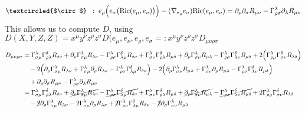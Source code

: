 \documentclass[a4paper,11pt]{article}
\newcommand{\R}{{\mathrm{Ric}}}
\begin{document}
\begin{align*}
    \textcircled{$\circ$}\;\;: \; e_\rho\Big(e_\sigma\big(\R(e_\mu, e_\nu)\big)\Big) - (\nabla_{e_\rho}e_\sigma)\R(e_\mu,e_\nu)
    = \partial_\rho\partial_\sigma R_{\mu\nu} - \Gamma_{\rho\sigma}^\lambda \partial_\lambda R_{\mu\nu}
\end{align*}
This allows us to compute $D$, using $D(X,Y,Z,Z)=x^\mu y^\nu z^\rho z^\sigma D(e_\mu, e_\nu, e_\rho, e_\sigma =: x^\mu y^\nu z^\rho z^\sigma D_{\mu\nu\rho\sigma}$
\begin{align*}
D_{\mu\nu\rho\sigma} &= \Gamma_{\sigma\mu}^\lambda\Gamma_{\rho\lambda}^\delta R_{\delta\nu}
    + \partial_\rho\Gamma_{\sigma\mu}^\lambda R_{\lambda\nu}
    - \Gamma_{\rho\sigma}^\lambda \Gamma_{\lambda\mu}^\delta R_{\delta\nu}
    + \Gamma_{\sigma\nu}^\lambda \Gamma_{\rho\lambda}^\delta R_{\mu\delta}
    + \partial_\rho  \Gamma_{\sigma\nu}^\lambda R_{\mu\lambda}
    - \Gamma_{\rho\sigma}^\lambda \Gamma_{\lambda\nu}^\delta R_{\mu\delta}
    + 2 \Big(\Gamma_{\rho\mu}^\lambda\Gamma_{\sigma\nu}^\delta R_{\lambda\delta}\Big)\\
    &\quad -2\Big( \partial_\rho \Gamma_{\sigma\mu}^\lambda R_{\lambda\nu} + \Gamma_{\sigma\mu}^\lambda \partial_\rho R_{\lambda\nu} - \Gamma_{\rho\sigma}^\lambda \Gamma_{\lambda\mu}^\delta R_{\delta\nu}\Big)
    -2 \Big(\partial_\rho \Gamma_{\sigma\nu}^\lambda R_{\mu\lambda}
    + \Gamma_{\sigma\nu}^\lambda \partial_\rho R_{\mu\lambda}
    - \Gamma_{\rho\sigma}^\lambda \Gamma_{\lambda\nu}^\delta R_{\mu\delta}\Big)\\
    &\quad  + \partial_\rho\partial_\sigma R_{\mu\nu}
    - \Gamma_{\rho\sigma}^\lambda \partial_\lambda R_{\mu\nu}\\
    &= \Gamma_{\sigma\mu}^\lambda\Gamma_{\rho\lambda}^\delta R_{\delta\nu}
    + \cancel{\partial_\rho\Gamma_{\sigma\mu}^\lambda R_{\lambda\nu}}
    - \cancel{\Gamma_{\rho\sigma}^\lambda \Gamma_{\lambda\mu}^\delta R_{\delta\nu}}
    + \Gamma_{\sigma\nu}^\lambda \Gamma_{\rho\lambda}^\delta R_{\mu\delta}
    + \cancel{\partial_\rho  \Gamma_{\sigma\nu}^\lambda R_{\mu\lambda}}
    - \cancel{\Gamma_{\rho\sigma}^\lambda \Gamma_{\lambda\nu}^\delta R_{\mu\delta}}
    + 2 \Gamma_{\rho\mu}^\lambda\Gamma_{\sigma\nu}^\delta R_{\lambda\delta}\\
    &\quad -\cancel{2} \partial_\rho \Gamma_{\sigma\mu}^\lambda R_{\lambda\nu}
    -2 \Gamma_{\sigma\mu}^\lambda \partial_\rho R_{\lambda\nu}
    +\cancel{2} \Gamma_{\rho\sigma}^\lambda \Gamma_{\lambda\mu}^\delta R_{\delta\nu}
    -\cancel{2} \partial_\rho \Gamma_{\sigma\nu}^\lambda R_{\mu\lambda}

\end{align*}
\end{document}
